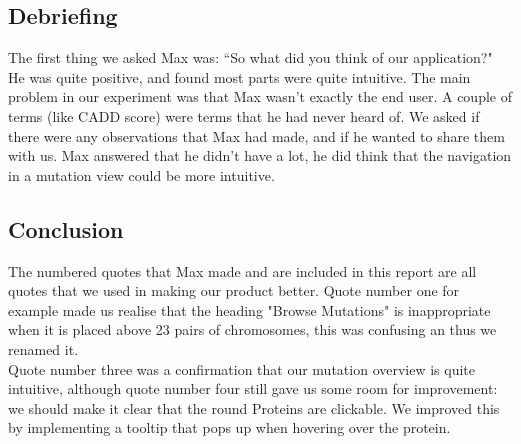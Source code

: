 \subsection{Debriefing}
The first thing we asked Max was: ``So what did you think of our application?" He was quite positive, and found most parts were quite intuitive. The main problem in our experiment was that Max wasn't exactly the end user. A couple of terms (like CADD score) were terms that he had never heard of. We asked if there were any observations that Max had made, and if he wanted to share them with us. Max answered that he didn't have a lot, he did think that the navigation in a mutation view could be more intuitive. 
\subsection{Conclusion}
The numbered quotes that Max made and are included in this report are all quotes that we used in making our product better. Quote number one for example made us realise that the heading "Browse Mutations" is inappropriate when it is placed above 23 pairs of chromosomes, this was confusing an thus we renamed it. \\
Quote number three was a confirmation that our mutation overview is quite intuitive, although quote number four still gave us some room for improvement: we should make it clear that the round Proteins are clickable. We improved this by implementing a tooltip that pops up when hovering over the protein.  
